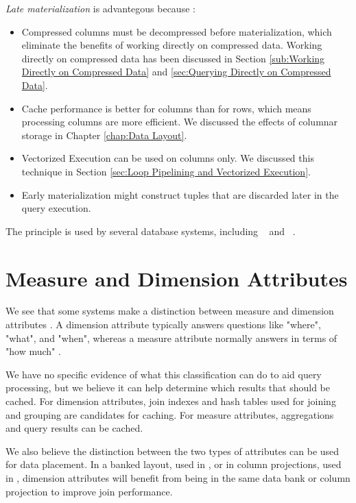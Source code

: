 \textit{Late materialization} is advantegous because \cite{Abadi2008-dd}:
\begin{itemize}
  \item Compressed columns must be decompressed before materialization, which eliminate the benefits of working directly on compressed data. Working directly on compressed data has been discussed in Section \ref{sub:Working Directly on Compressed Data} and \ref{sec:Querying Directly on Compressed Data}.
  \item Cache performance is better for columns than for rows, which means processing columns are more efficient. We discussed the effects of columnar storage in Chapter \ref{chap:Data Layout}.
  \item Vectorized Execution can be used on columns only. We discussed this technique in Section \ref{sec:Loop Pipelining and Vectorized Execution}.
  \item Early materialization might construct tuples that are discarded later in the query execution.
\end{itemize}


The  principle is used by several database systems, including \ibm~\cite{Raman2013-em} and \monetdb~\cite{Boncz2002-yj}. 

\section{Measure and Dimension Attributes}
\label{sec:Measure and Dimension Attributes}
We see that some systems make a distinction between measure and dimension attributes \cite{Johnson2008-cp, Kamkolkar2015-iq}. A dimension attribute typically answers questions like "where", "what", and "when", whereas a measure attribute normally answers in terms of "how much" \cite{noauthor_undated-es}. 

We have no specific evidence of what this classification can do to aid query processing, but we believe it can help determine which results that should be cached. For dimension attributes, join indexes and hash tables used for joining and grouping are candidates for caching. For measure attributes, aggregations and query results can be cached.

We also believe the distinction between the two types of attributes can be used for data placement. In a banked layout, used in \blink, or in column projections, used in \cstore, dimension attributes will benefit from being in the same data bank or column projection to improve join performance.

